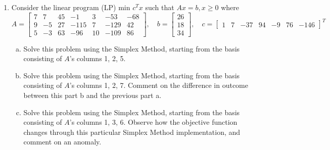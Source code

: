 \documentclass{article}
\begin{document}
\begin{enumerate}[1:]
	\item Consider the linear program (LP) min $c^T x$ such that $Ax=b, x\ge 0$ where \[A=\begin{bmatrix}
				7 & 7 & 45 & -1 & 3 & -53 & -68 \\
				9 & -5 & 27 &  -115 & 7 & -129 & 42 \\
				5 & -3 & 63 & -96 & 10 & -109 & 86
			\end{bmatrix}, \quad b=\begin{bmatrix}
				26 \\ 18 \\ 34
			\end{bmatrix}, \quad c=\begin{bmatrix}
				1 & 7 & -37 & 94 & -9 & 76 & -146
		\end{bmatrix}^T\]
		\begin{enumerate}[a)]
			\item Solve this problem using the Simplex Method, starting from the basis consisting of $A$'s columns 1, 2, 5.

			\item Solve this problem using the Simplex Method, starting from the basis consisting of $A$'s columns 1, 2, 7. Comment on the difference in outcome between this part b and the previous part a.

			\item Solve this problem using the Simplex Method, starting from the basis consisting of $A$'s columns 1, 3, 6. Observe how the objective function changes through this particular Simplex Method implementation, and comment on an anomaly.
				
		\end{enumerate}
\end{enumerate}
\end{document}

